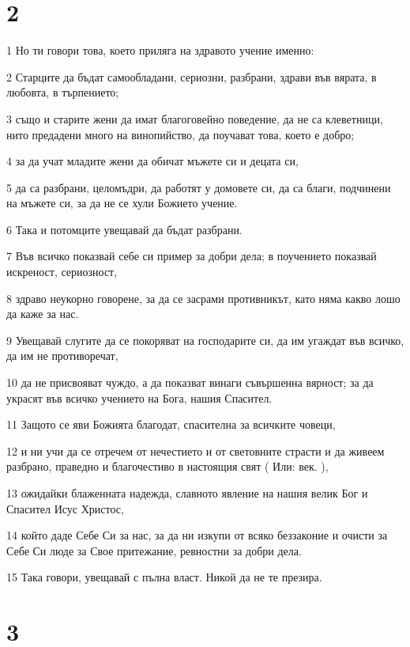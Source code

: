 \chapter{2}

\par 1 Но ти говори това, което приляга на здравото учение именно:
\par 2 Старците да бъдат самообладани, сериозни, разбрани, здрави във вярата, в любовта, в търпението;
\par 3 също и старите жени да имат благоговейно поведение, да не са клеветници, нито предадени много на винопийство, да поучават това, което е добро;
\par 4 за да учат младите жени да обичат мъжете си и децата си,
\par 5 да са разбрани, целомъдри, да работят у домовете си, да са благи, подчинени на мъжете си, за да не се хули Божието учение.
\par 6 Така и потомците увещавай да бъдат разбрани.
\par 7 Във всичко показвай себе си пример за добри дела; в поучението показвай искреност, сериозност,
\par 8 здраво неукорно говорене, за да се засрами противникът, като няма какво лошо да каже за нас.
\par 9 Увещавай слугите да се покоряват на господарите си, да им угаждат във всичко, да им не противоречат,
\par 10 да не присвояват чуждо, а да показват винаги съвършенна вярност; за да украсят във всичко учението на Бога, нашия Спасител.
\par 11 Защото се яви Божията благодат, спасителна за всичките човеци,
\par 12 и ни учи да се отречем от нечестието и от световните страсти и да живеем разбрано, праведно и благочестиво в настоящия свят ( Или: век. ),
\par 13 ожидайки блаженната надежда, славното явление на нашия велик Бог и Спасител Исус Христос,
\par 14 който даде Себе Си за нас, за да ни изкупи от всяко беззаконие и очисти за Себе Си люде за Свое притежание, ревностни за добри дела.
\par 15 Така говори, увещавай с пълна власт. Никой да не те презира.

\chapter{3}

